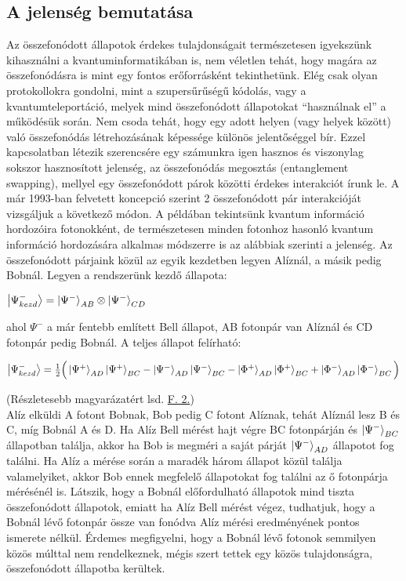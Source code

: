 \subsection{A jelenség bemutatása}
Az összefonódott állapotok érdekes tulajdonságait természetesen igyekszünk kihasználni a kvantuminformatikában is, nem véletlen tehát, hogy magára az összefonódásra is mint egy fontos erőforrásként tekinthetünk. Elég csak olyan protokollokra gondolni, mint a szupersűrűségű kódolás, vagy a kvantumteleportáció, melyek mind összefonódott állapotokat “használnak el” a működésük során. Nem csoda tehát, hogy egy adott helyen (vagy helyek között) való összefonódás létrehozásának képessége különös jelentőséggel bír. Ezzel kapcsolatban létezik szerencsére egy számunkra igen hasznos és viszonylag sokszor hasznosított jelenség, az összefonódás megosztás (entanglement swapping), mellyel egy összefonódott párok közötti érdekes interakciót írunk le. A már 1993-ban felvetett koncepció szerint \cite{zukowski1993event} 2 összefonódott pár interakcióját vizsgáljuk a következő módon. A példában tekintsünk kvantum információ hordozóira fotonokként, de természetesen minden fotonhoz hasonló kvantum információ hordozására alkalmas módszerre is az alábbiak szerinti a jelenség. Az összefonódott párjaink közül az egyik kezdetben legyen Alíznál, a másik pedig Bobnál. Legyen a rendszerünk kezdő állapota:
\begin{center}
$ \ket{\Psi_{kezd}^-}= \ket{\Psi^-}_{AB} \otimes \ket{\Psi^-}_{CD} $
\end{center}
ahol $ \Psi^- $ a már fentebb említett Bell állapot, AB fotonpár van Alíznál és CD fotonpár pedig Bobnál. A teljes állapot felírható:
\begin{center}
$ \ket{\Psi_{kezd}^-} = \frac{1}{2} \Big( \ket{\Psi^+}_{AD}\ket{\Psi^+}_{BC}-\ket{\Psi^-}_{AD}\ket{\Psi^-}_{BC} - \ket{\Phi^+}_{AD}\ket{\Phi^+}_{BC}+\ket{\Phi^-}_{AD}\ket{\Phi^-}_{BC} \Big) $
\end{center}
(Részletesebb magyarázatért lsd. \hyperref[osszfonmeg]{F. 2.})\\
Alíz elküldi A fotont Bobnak, Bob pedig C fotont Alíznak, tehát Alíznál lesz B és C, míg Bobnál A és D. Ha Alíz Bell mérést hajt végre BC fotonpárján és $ \ket{\Psi^-}_{BC} $  állapotban találja, akkor ha Bob is megméri a saját párját $ \ket{\Psi^-}_{AD} $ állapotot fog találni. Ha Alíz a mérése során a maradék három állapot közül találja valamelyiket, akkor Bob ennek megfelelő állapotokat fog találni az ő fotonpárja mérésénél is. Látszik, hogy a Bobnál előfordulható állapotok mind tiszta összefonódott állapotok, emiatt ha Alíz Bell mérést végez, tudhatjuk, hogy a Bobnál lévő fotonpár össze van fonódva Alíz mérési eredményének pontos ismerete nélkül. Érdemes megfigyelni, hogy a Bobnál lévő fotonok semmilyen közös múlttal nem rendelkeznek, mégis szert tettek egy közös tulajdonságra, összefonódott állapotba kerültek.
